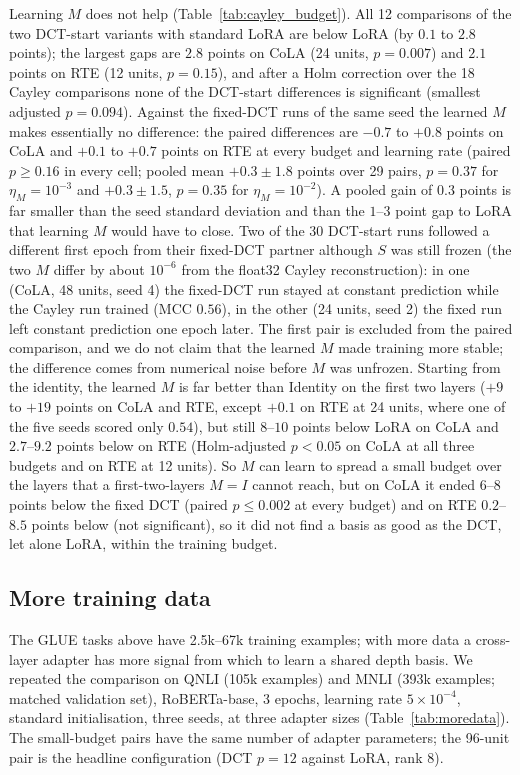 \documentclass{article}
\theoremstyle{plain}
\begin{document}
Learning $M$ does not help (Table~\ref{tab:cayley_budget}).
All 12 comparisons of the two DCT-start variants with standard LoRA are below LoRA (by $0.1$ to $2.8$ points); the largest gaps are $2.8$ points on CoLA (24 units, $p=0.007$) and $2.1$ points on RTE (12 units, $p=0.15$), and after a Holm correction over the 18 Cayley comparisons none of the DCT-start differences is significant (smallest adjusted $p=0.094$).
Against the fixed-DCT runs of the same seed the learned $M$ makes essentially no difference: the paired differences are $-0.7$ to $+0.8$ points on CoLA and $+0.1$ to $+0.7$ points on RTE at every budget and learning rate (paired $p\geq0.16$ in every cell; pooled mean $+0.3\pm1.8$ points over 29 pairs, $p=0.37$ for $\eta_M=10^{-3}$ and $+0.3\pm1.5$, $p=0.35$ for $\eta_M=10^{-2}$).
A pooled gain of 0.3 points is far smaller than the seed standard deviation and than the $1$--$3$ point gap to LoRA that learning $M$ would have to close.
Two of the 30 DCT-start runs followed a different first epoch from their fixed-DCT partner although $S$ was still frozen (the two $M$ differ by about $10^{-6}$ from the float32 Cayley reconstruction): in one (CoLA, 48 units, seed 4) the fixed-DCT run stayed at constant prediction while the Cayley run trained (MCC $0.56$), in the other (24 units, seed 2) the fixed run left constant prediction one epoch later.
The first pair is excluded from the paired comparison, and we do not claim that the learned $M$ made training more stable; the difference comes from numerical noise before $M$ was unfrozen.
Starting from the identity, the learned $M$ is far better than Identity on the first two layers ($+9$ to $+19$ points on CoLA and RTE, except $+0.1$ on RTE at 24 units, where one of the five seeds scored only $0.54$), but still $8$--$10$ points below LoRA on CoLA and $2.7$--$9.2$ points below on RTE (Holm-adjusted $p<0.05$ on CoLA at all three budgets and on RTE at 12 units).
So $M$ can learn to spread a small budget over the layers that a first-two-layers $M=I$ cannot reach, but on CoLA it ended $6$--$8$ points below the fixed DCT (paired $p\le0.002$ at every budget) and on RTE $0.2$--$8.5$ points below (not significant), so it did not find a basis as good as the DCT, let alone LoRA, within the training budget.

\subsection{More training data}
\label{sec:moredata}

The GLUE tasks above have 2.5k--67k training examples; with more data a cross-layer adapter has more signal from which to learn a shared depth basis.
We repeated the comparison on QNLI (105k examples) and MNLI (393k examples; matched validation set), RoBERTa-base, 3 epochs, learning rate $5\times10^{-4}$, standard initialisation, three seeds,
at three adapter sizes (Table~\ref{tab:moredata}).
The small-budget pairs have the same number of adapter parameters; the 96-unit pair is the headline configuration (DCT $p=12$ against LoRA, rank 8).
\end{document}
